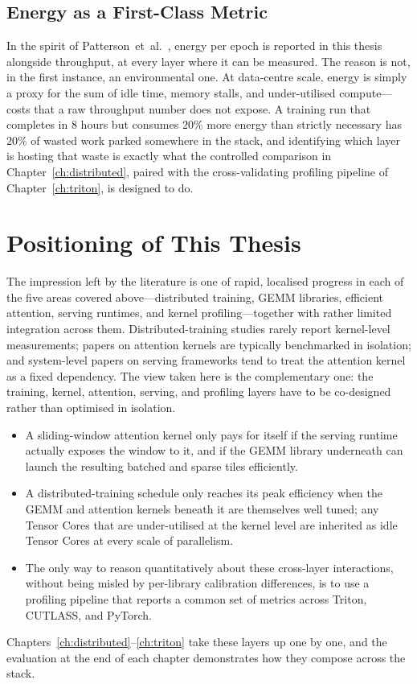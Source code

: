 \subsection{Energy as a First-Class
Metric}\label{sec:lit_energy_metric}
In the spirit of
Patterson~et~al.~\cite{patterson2021carbon}, energy per epoch is
reported in this thesis alongside throughput, at every layer where
it can be measured. The reason is not, in the first instance, an
environmental one. At data-centre scale, energy is simply a proxy
for the sum of idle time, memory stalls, and under-utilised
compute---costs that a raw throughput number does not expose. A
training run that completes in $8$ hours but consumes $20\%$ more
energy than strictly necessary has $20\%$ of wasted work parked
somewhere in the stack, and identifying which layer is hosting that
waste is exactly what the controlled comparison in
Chapter~\ref{ch:distributed}, paired with the cross-validating
profiling pipeline of Chapter~\ref{ch:triton}, is designed to do.

\section{Positioning of This Thesis}\label{sec:lit_gap}

The impression left by the literature is one of rapid, localised
progress in each of the five areas covered above---distributed
training, GEMM libraries, efficient attention, serving runtimes,
and kernel profiling---together with rather limited integration
across them. Distributed-training studies rarely report
kernel-level measurements; papers on attention kernels are
typically benchmarked in isolation; and system-level papers on
serving frameworks tend to treat the attention kernel as a fixed
dependency. The view taken here is the complementary one: the
training, kernel, attention, serving, and profiling layers have to
be co-designed rather than optimised in isolation.
\begin{itemize}
    \item A sliding-window attention kernel only pays for itself if
          the serving runtime actually exposes the window to it, and
          if the GEMM library underneath can launch the resulting
          batched and sparse tiles efficiently.
    \item A distributed-training schedule only reaches its peak
          efficiency when the GEMM and attention kernels beneath
          it are themselves well tuned; any Tensor Cores that are
          under-utilised at the kernel level are inherited as idle
          Tensor Cores at every scale of parallelism.
    \item The only way to reason quantitatively about these
          cross-layer interactions, without being misled by
          per-library calibration differences, is to use a
          profiling pipeline that reports a common set of metrics
          across Triton, CUTLASS, and PyTorch.
\end{itemize}
Chapters~\ref{ch:distributed}--\ref{ch:triton} take these layers
up one by one, and the evaluation at the end of each chapter
demonstrates how they compose across the stack.

